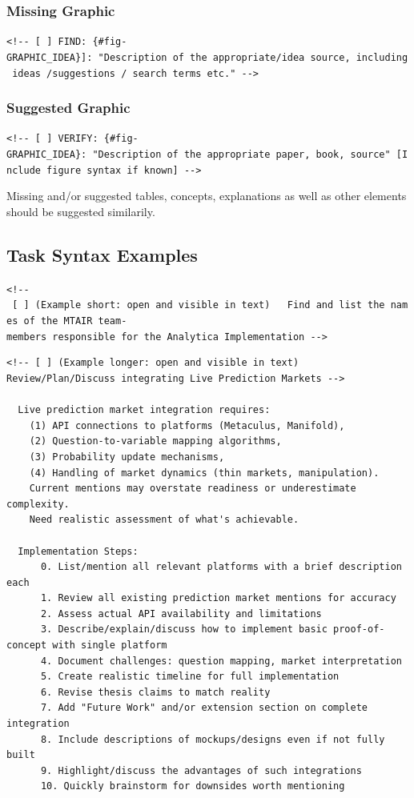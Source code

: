 \documentclass[
  11pt,
  letterpaper,
]{book}
\begin{document}
\subsubsection*{Missing Graphic}\label{missing-graphic}

\texttt{\textless{}!-\/-\ {[}\ {]}\ FIND:\ \{\#fig-GRAPHIC\_IDEA\}{]}:\ "Description\ of\ the\ appropriate/idea\ source,\ including\ ideas\ /suggestions\ /\ search\ terms\ etc."\ -\/-\textgreater{}}

\subsubsection*{Suggested Graphic}\label{suggested-graphic}

\texttt{\textless{}!-\/-\ {[}\ {]}\ VERIFY:\ \{\#fig-GRAPHIC\_IDEA\}:\ "Description\ of\ the\ appropriate\ paper,\ book,\ source"\ {[}Include\ figure\ syntax\ if\ known{]}\ -\/-\textgreater{}}

Missing and/or suggested tables, concepts, explanations as well as other
elements should be suggested similarily.

\subsection*{Task Syntax Examples}\label{task-syntax-examples}

\texttt{\textless{}!-\/-\ {[}\ {]}\ (Example\ short:\ open\ and\ visible\ in\ text)\ \ \ Find\ and\ list\ the\ names\ of\ the\ MTAIR\ team-members\ responsible\ for\ the\ Analytica\ Implementation\ -\/-\textgreater{}}

\begin{verbatim}
<!-- [ ] (Example longer: open and visible in text)    Review/Plan/Discuss integrating Live Prediction Markets -->

  Live prediction market integration requires:
    (1) API connections to platforms (Metaculus, Manifold),
    (2) Question-to-variable mapping algorithms,
    (3) Probability update mechanisms, 
    (4) Handling of market dynamics (thin markets, manipulation).
    Current mentions may overstate readiness or underestimate complexity.
    Need realistic assessment of what's achievable.

  Implementation Steps:
      0. List/mention all relevant platforms with a brief description each
      1. Review all existing prediction market mentions for accuracy
      2. Assess actual API availability and limitations
      3. Describe/explain/discuss how to implement basic proof-of-concept with single platform
      4. Document challenges: question mapping, market interpretation
      5. Create realistic timeline for full implementation
      6. Revise thesis claims to match reality
      7. Add "Future Work" and/or extension section on complete integration
      8. Include descriptions of mockups/designs even if not fully built 
      9. Highlight/discuss the advantages of such integrations
      10. Quickly brainstorm for downsides worth mentioning
\end{verbatim}
\end{document}
